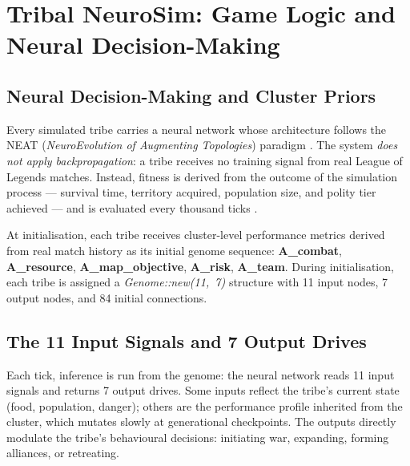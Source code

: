 \chapter{Tribal NeuroSim: Game Logic and Neural Decision-Making}

\section{Neural Decision-Making and Cluster Priors}

Every simulated tribe carries a neural network whose architecture follows the NEAT (\textit{NeuroEvolution of Augmenting Topologies}) paradigm \cite{stanleymiikkulainen2002}. The system \textit{does not apply backpropagation}: a tribe receives no training signal from real League of Legends matches. Instead, fitness is derived from the outcome of the simulation process --- survival time, territory acquired, population size, and polity tier achieved --- and is evaluated every thousand ticks \cite{holland1992}.

At initialisation, each tribe receives cluster-level performance metrics derived from real match history as its initial genome sequence: \textbf{A\_combat}, \textbf{A\_resource}, \textbf{A\_map\_objective}, \textbf{A\_risk}, \textbf{A\_team}. During initialisation, each tribe is assigned a \textit{Genome::new(11,~7)} structure with 11 input nodes, 7 output nodes, and 84 initial connections.

\section{The 11 Input Signals and 7 Output Drives}

Each tick, inference is run from the genome: the neural network reads 11 input signals and returns 7 output drives. Some inputs reflect the tribe's current state (food, population, danger); others are the performance profile inherited from the cluster, which mutates slowly at generational checkpoints. The outputs directly modulate the tribe's behavioural decisions: initiating war, expanding, forming alliances, or retreating.

